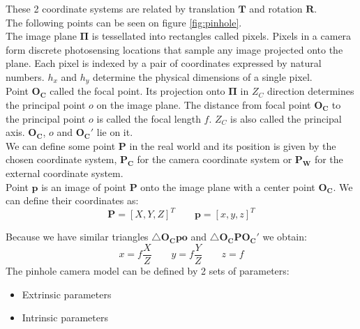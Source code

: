 These 2 coordinate systems are related by translation $\pmb{T}$ and rotation $\pmb{R}$. \\
The following points can be seen on figure \ref{fig:pinhole}. \\
The image plane $\pmb{\Pi}$ is tessellated into rectangles called pixels. Pixels in a camera form discrete photosensing locations that sample any image projected onto the plane. Each pixel is indexed by a pair of coordinates expressed by natural numbers. $h_x$ and $h_y$ determine the physical dimensions of a single pixel. \\
Point $\pmb{O_C}$ called the focal point. Its projection onto $\pmb{\Pi}$ in $Z_C$ direction determines the principal point $o$ on the image plane. The distance from focal point $\pmb{O_C}$ to the principal point $o$ is called the focal length $f$. $Z_C$ is also called the principal axis. $\pmb{O_C}$, $o$ and $\pmb{O_C'}$ lie on it.  \\
We can define some point $\pmb{P}$ in the real world and its position is given by the chosen coordinate system, $\pmb{P_C}$ for the camera coordinate system or $\pmb{P_W}$ for the external coordinate system. \\
Point $\pmb{p}$ is an image of point $\pmb{P}$ onto the image plane with a center point $\pmb{O_C}$. We can define their coordinates as: 
\[
    \pmb{P} = [X, Y, Z]^T  \qquad \pmb{p} = [x, y, z]^T
\]


Because we have similar triangles $\triangle\pmb{O_C p o}$ and $\triangle\pmb{O_C P O_C'}$ we obtain:
\[
    x=f\frac{X}{Z} \qquad y=f\frac{Y}{Z} \qquad z =f
\]
The pinhole camera model can be defined by 2 sets of parameters:
\begin{itemize}
    \item Extrinsic parameters
    \item Intrinsic parameters
\end{itemize}